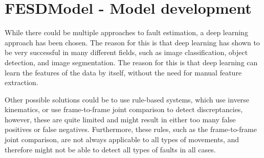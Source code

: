 \chapter[FESDModel]{FESDModel - Model development}
\label{sec:model_development}

While there could be multiple approaches to fault estimation, a deep learning approach has been chosen. The reason for this is that deep learning has shown to be very successful in many different fields, such as image classification, object detection, and image segmentation. The reason for this is that deep learning can learn the features of the data by itself, without the need for manual feature extraction.

Other possible solutions could be to use rule-based systems, which use inverse kinematics, or use frame-to-frame joint comparison to detect discreptancies, however, these are quite limited and might result in either too many false positives or false negatives. Furthermore, these rules, such as the frame-to-frame joint comparison, are not always applicable to all types of movements, and therefore might not be able to detect all types of faults in all cases.




